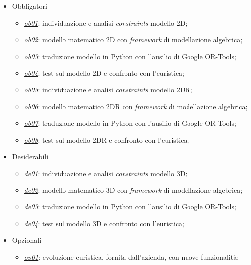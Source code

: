 \begin{itemize}
	\item Obbligatori
	      \begin{itemize}
	      	\item \underline{\textit{ob01}}: individuazione e analisi \textit{constraints} modello 2D;
	      	\item \underline{\textit{ob02}}: modello matematico 2D con \textit{framework} di modellazione algebrica;
	      	\item \underline{\textit{ob03}}: traduzione modello in Python con l'ausilio di Google OR-Tools;
	      	\item \underline{\textit{ob04}}: test sul modello 2D e confronto con l'euristica;
	      	\item \underline{\textit{ob05}}: individuazione e analisi \textit{constraints} modello 2DR; 
	      	\item \underline{\textit{ob06}}: modello matematico 2DR con \textit{framework} di modellazione algebrica;
	      	\item \underline{\textit{ob07}}: traduzione modello in Python con l'ausilio di Google OR-Tools;
	      	\item \underline{\textit{ob08}}: test sul modello 2DR e confronto con l'euristica;
	      \end{itemize}
	\item Desiderabili
	      \begin{itemize}
	      	\item \underline{\textit{de01}}: individuazione e analisi \textit{constraints} modello 3D;
	      	\item \underline{\textit{de02}}: modello matematico 3D con \textit{framework} di modellazione algebrica;
	      	\item \underline{\textit{de03}}: traduzione modello in Python con l'ausilio di Google OR-Tools;
	      	\item \underline{\textit{de04}}: test sul modello 3D e confronto con l'euristica;
	      \end{itemize}
	\item Opzionali
	      \begin{itemize}
	      	\item \underline{\textit{op01}}: evoluzione euristica, fornita dall'azienda, con nuove funzionalità;
	      \end{itemize} 
\end{itemize}
